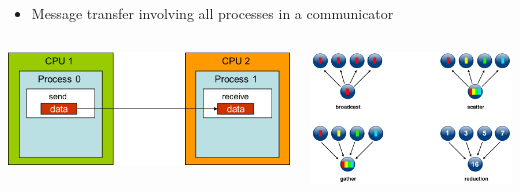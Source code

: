 \documentclass[10pt,t]{beamer}
\begin{document}
\begin{frame}
\begin{itemize}
    \begin{itemize}
    \item Message transfer involving all processes in a communicator
    \end{itemize}
  \end{itemize}
  \begin{columns}
    \begin{center}
      \includegraphics[width=\textwidth]{./SimpleSendAndRecv}
    \end{center}
    \begin{center}
      \includegraphics[width=\textwidth]{./collective_comm}
    \end{center}
  \end{columns}
\end{frame}
\end{document}
